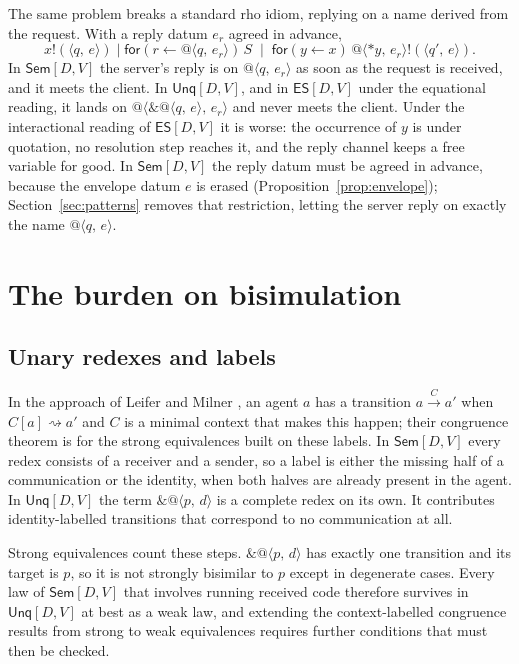 \documentclass[11pt,a4paper]{article}
\makeatletter
\theoremstyle{plain}
\theoremstyle{definition}
\theoremstyle{remark}
\newcommand{\rhoc}{\textsf{rho}}
\newcommand{\pr}[2]{\langle #1,\,#2\rangle}
\newcommand{\qn}[2]{@\langle #1,\,#2\rangle}
\newcommand{\out}[2]{#1!(#2)}
\newcommand{\rcv}[3]{\mathsf{for}(#1 \leftarrow #2)\,#3}
\newcommand{\drop}[1]{{*}#1}
\newcommand{\unq}[1]{\mathop{\&}#1}
\newcommand{\red}{\rightsquigarrow}
\newcommand{\Sem}{\textsf{Sem}[D,V]}
\newcommand{\Unq}{\textsf{Unq}[D,V]}
\newcommand{\ES}{\textsf{ES}[D,V]}
\makeatother
\begin{document}
The same problem breaks a standard \rhoc{} idiom, replying on a name derived
from the request. With a reply datum $e_r$ agreed in advance,
\[
  \out{x}{\pr{q}{e}}\mid\rcv{r}{\qn{q}{e_r}}{S}\;\mid\;
  \rcv{y}{x}{\out{\qn{\drop{y}}{e_r}}{\pr{q'}{e}}}.
\]
In $\Sem$ the server's reply is on $\qn{q}{e_r}$ as soon as the request is
received, and it meets the client. In $\Unq$, and in $\ES$ under the
equational reading, it lands on $\qn{\unq{\qn{q}{e}}}{e_r}$ and never meets
the client. Under the interactional reading of $\ES$ it is worse: the
occurrence of $y$ is under quotation, no resolution step reaches it, and the
reply channel keeps a free variable for good. In $\Sem$ the reply datum must
be agreed in advance, because the envelope datum $e$ is erased
(Proposition~\ref{prop:envelope}); Section~\ref{sec:patterns} removes that
restriction, letting the server reply on exactly the name $\qn{q}{e}$.

\section{The burden on bisimulation}\label{sec:bisim}

\subsection{Unary redexes and labels}

In the approach of Leifer and Milner \cite{LM00}, an agent $a$ has a
transition $a\xrightarrow{C}a'$ when $C[a]\red a'$ and $C$ is a minimal
context that makes this happen; their congruence theorem is for the strong
equivalences built on these labels. In $\Sem$ every redex consists of a
receiver and a sender, so a label is either the missing half of a
communication or the identity, when both halves are already present in the
agent. In $\Unq$ the term $\unq{\qn{p}{d}}$ is a complete redex on its own. It
contributes identity-labelled transitions that correspond to no communication
at all.

Strong equivalences count these steps. $\unq{\qn{p}{d}}$ has exactly one
transition and its target is $p$, so it is not strongly bisimilar to $p$
except in degenerate cases. Every law of $\Sem$ that involves running
received code therefore survives in $\Unq$ at best as a weak law, and
extending the context-labelled congruence results from strong to weak
equivalences requires further conditions that must then be checked.
\end{document}
